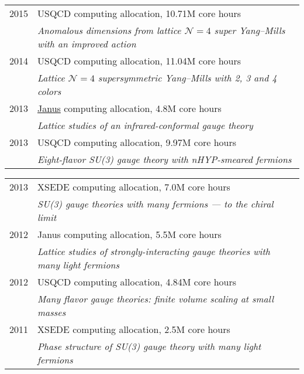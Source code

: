 \begin{spacelist}
\begin{tabular}[t]{cl}
      2015 & USQCD computing allocation, 10.71M core hours                                                            \\ %
           & \textit{Anomalous dimensions from lattice $\mathcal N = 4$ super Yang--Mills with an improved action}    \\[6 pt]
      2014 & USQCD computing allocation, 11.04M core hours                                                            \\ %
           & \textit{Lattice $\mathcal N = 4$ supersymmetric Yang--Mills with 2, 3 and 4 colors}                      \\[6 pt]
      2013 & \href{https://www.top500.org/system/176922}{Janus} computing allocation, 4.8M core hours                 \\ %
           & \textit{Lattice studies of an infrared-conformal gauge theory}                                           \\[6 pt]
      2013 & USQCD computing allocation, 9.97M core hours                                                             \\ %
           & \textit{Eight-flavor SU(3) gauge theory with nHYP-smeared fermions}                                      \\[6 pt]
    \end{tabular} %
    \begin{tabular}[t]{cl}
      2013 & XSEDE computing allocation, 7.0M core hours                                                              \\ %
           & \textit{SU(3) gauge theories with many fermions --- to the chiral limit}                                 \\[6 pt]
      2012 & Janus computing allocation, 5.5M core hours                                                              \\ %
           & \textit{Lattice studies of strongly-interacting gauge theories with many light fermions}                 \\[6 pt]
      2012 & USQCD computing allocation, 4.84M core hours                                                             \\ %
           & \textit{Many flavor gauge theories: finite volume scaling at small masses}                               \\[6 pt]
      2011 & XSEDE computing allocation, 2.5M core hours                                                              \\ %
           & \textit{Phase structure of SU(3) gauge theory with many light fermions}                                  \\
    \end{tabular}


\end{spacelist}
